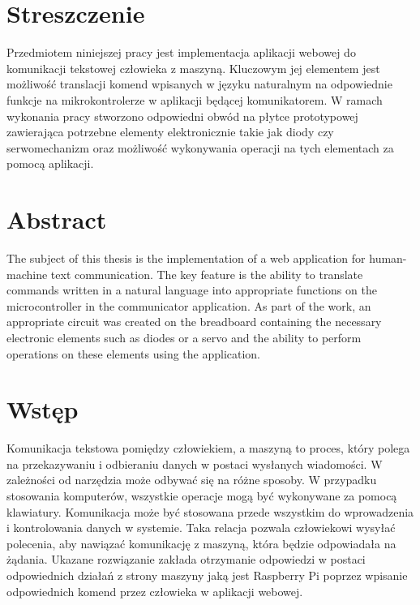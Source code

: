 \section{Streszczenie}
Przedmiotem niniejszej pracy jest implementacja aplikacji webowej do komunikacji tekstowej człowieka z maszyną. Kluczowym jej elementem jest możliwość translacji komend wpisanych w języku naturalnym na odpowiednie funkcje na mikrokontrolerze w aplikacji będącej komunikatorem. W ramach wykonania pracy stworzono odpowiedni obwód na płytce prototypowej zawierająca potrzebne elementy elektronicznie takie jak diody czy serwomechanizm oraz możliwość wykonywania operacji na tych elementach za pomocą aplikacji.
\section{Abstract}
The subject of this thesis is the implementation of a web application for human-machine text communication. The key feature is the ability to translate commands written in a natural language into appropriate functions on the microcontroller in the communicator application. As part of the work, an appropriate circuit was created on the breadboard containing the necessary electronic elements such as diodes or a servo and the ability to perform operations on these elements using the application.
\section{Wstęp}
Komunikacja tekstowa pomiędzy człowiekiem, a maszyną to proces, który polega na przekazywaniu i odbieraniu danych w postaci wysłanych wiadomości. W zależności od narzędzia może odbywać się na różne sposoby. W przypadku stosowania komputerów, wszystkie operacje mogą być wykonywane za pomocą klawiatury. Komunikacja może być stosowana przede wszystkim do wprowadzenia i kontrolowania danych w systemie. Taka relacja pozwala człowiekowi wysyłać polecenia, aby nawiązać komunikację z maszyną, która będzie odpowiadała na żądania. Ukazane rozwiązanie zakłada otrzymanie odpowiedzi w postaci odpowiednich działań z strony maszyny jaką jest Raspberry Pi poprzez wpisanie odpowiednich komend przez człowieka w aplikacji webowej.
